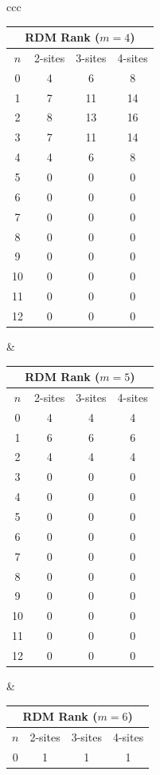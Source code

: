 \documentclass[11pt]{article}
\begin{document}
\begin{itemize}
\begin{itemize}
\begin{table}[H]
\begin{tabular}{ccc}
\begin{tabular}{|c|c|c|c|}
	\hline
	\multicolumn{4}{|c|}{\textbf{RDM Rank ($m = 4$)}} \\
	\hline
	$n$ & 2-sites & 3-sites & 4-sites \\
	\hline
	0 & 4 & 6 & 8 \\
	1 & 7 & 11 & 14 \\
	2 & 8 & 13 & 16 \\
	3 & 7 & 11 & 14 \\
	4 & 4 & 6 & 8 \\
	5 & 0 & 0 & 0 \\
	6 & 0 & 0 & 0 \\
	7 & 0 & 0 & 0 \\
	8 & 0 & 0 & 0 \\
	9 & 0 & 0 & 0 \\
	10 & 0 & 0 & 0 \\
	11 & 0 & 0 & 0 \\
	12 & 0 & 0 & 0 \\
	\hline
\end{tabular}
&
\begin{tabular}{|c|c|c|c|}
	\hline
	\multicolumn{4}{|c|}{\textbf{RDM Rank ($m = 5$)}} \\
	\hline
	$n$ & 2-sites & 3-sites & 4-sites \\
	\hline
	0 & 4 & 4 & 4 \\
	1 & 6 & 6 & 6 \\
	2 & 4 & 4 & 4 \\
	3 & 0 & 0 & 0 \\
	4 & 0 & 0 & 0 \\
	5 & 0 & 0 & 0 \\
	6 & 0 & 0 & 0 \\
	7 & 0 & 0 & 0 \\
	8 & 0 & 0 & 0 \\
	9 & 0 & 0 & 0 \\
	10 & 0 & 0 & 0 \\
	11 & 0 & 0 & 0 \\
	12 & 0 & 0 & 0 \\
	\hline
\end{tabular}
&
\begin{tabular}{|c|c|c|c|}
	\hline
	\multicolumn{4}{|c|}{\textbf{RDM Rank ($m = 6$)}} \\
	\hline
	$n$ & 2-sites & 3-sites & 4-sites \\
	\hline
	0 & 1 & 1 & 1 \\

\end{tabular}
\end{tabular}
\end{table}
\end{itemize}
\end{itemize}
\end{document}
